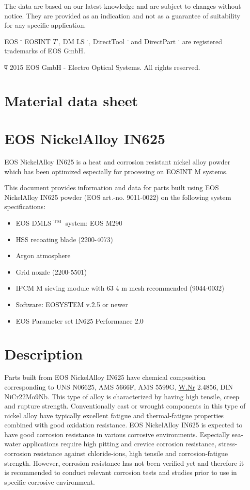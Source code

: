 \documentclass[10pt]{article}
\begin{document}
The data are based on our latest knowledge and are subject to changes without notice. They are provided as an indication and not as a guarantee of suitability for any specific application.

EOS ${ }^{\square}$ EOSINT $T^{\square}$, DM LS $^{\square}$, DirectTool ${ }^{\square}$ and DirectPart ${ }^{\square}$ are registered trademarks of EOS GmbH.

प 2015 EOS GmbH - Electro Optical Systems. All rights reserved.

\section*{Material data sheet}
\section*{EOS NickelAlloy IN625}
EOS NickelAlloy IN625 is a heat and corrosion resistant nickel alloy powder which has been optimized especially for processing on EOSINT M systems.

This document provides information and data for parts built using EOS NickelAlloy IN625 powder (EOS art.-no. 9011-0022) on the following system specifications:

\begin{itemize}
  \item EOS DMLS ${ }^{\text {TM }}$ system: EOS M290
  \item HSS recoating blade (2200-4073)
  \item Argon atmosphere
  \item Grid nozzle (2200-5501)
  \item IPCM M sieving module with 63 4 m mesh recommended (9044-0032)
  \item Software: EOSYSTEM v.2.5 or newer
  \item EOS Parameter set IN625 Performance 2.0
\end{itemize}

\section*{Description}
Parts built from EOS NickelAlloy IN625 have chemical composition corresponding to UNS N06625, AMS 5666F, AMS 5599G, \href{http://W.Nr}{W.Nr} 2.4856, DIN NiCr22Mo9Nb. This type of alloy is characterized by having high tensile, creep and rupture strength. Conventionally cast or wrought components in this type of nickel alloy have typically excellent fatigue and thermal-fatigue properties combined with good oxidation resistance. EOS NickelAlloy IN625 is expected to have good corrosion resistance in various corrosive environments. Especially sea-water applications require high pitting and crevice corrosion resistance, stress-corrosion resistance against chloride-ions, high tensile and corrosion-fatigue strength. However, corrosion resistance has not been verified yet and therefore it is recommended to conduct relevant corrosion tests and studies prior to use in specific corrosive environment.
\end{document}
